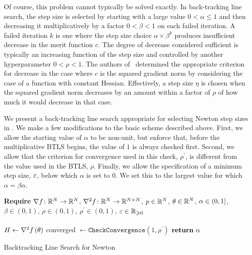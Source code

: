 \documentclass[../../thesis.tex]{subfiles}
\begin{document}
Of course, this problem cannot typically be solved exactly.
In back-tracking line search,
the step size is selected by starting with a large value
$0 < \alpha \leq 1$
and then decreasing it multiplicatively by a factor $0 < \beta < 1$
on each failed iteration.
A failed iteration $k$ is one where the step size choice
$\alpha \times \beta^k$
produces insufficient decrease in the merit function $c$.
The degree of decrease considered sufficient
is typically an increasing function of the step size
and controlled by another hyperparameter $0 < \rho < 1$.
The authors of~\cite{roosta2018}
determined the appropriate criterion for decrease
in the case where $c$ is the squared gradient norm
by considering the case of a function with constant Hessian.
Effectively, a step size $\eta$ is chosen
when the squared gradient norm decreases by an amount within
a factor of $\rho$ of how much it would decrease
in that case.

We present a back-tracking line search
appropriate for selecting Newton step sizes
in .
We make a few modifications to the basic scheme described above.
First, we allow the starting value of $\alpha$ to be non-unit,
but enforce that, before the multiplicative BTLS begins,
the value of $1$ is always checked first.
Second, we allow that
the criterion for convergence used in this check,
$\rho^\prime$,
is different from the value
used in the BTLS, $\rho$.
Finally,
we allow the specification of a minimum step size, $\varepsilon$,
below which $\alpha$ is set to $0$.
We set this to the largest value for which
$\alpha = \beta\alpha$.
\\
\begin{algorithm}[h]
    \SetAlgoLined{}
    \textbf{Require}
    $\nabla f\colon\mathbb{R}^N\to\mathbb{R}^N$,
    $\nabla^2 f\colon\mathbb{R}^N\to\mathbb{R}^{N\times N}$,
    $p \in \mathbb{R}^N$,
    $\theta \in \mathbb{R}^N$,
    $\alpha \in \intervaloc{0}{1}$,
    $\beta \in (0, 1)$,
    $\rho \in (0, 1)$,
    $\rho^\prime \in (0, 1)$,
    $\varepsilon \in \mathbb{R}_{\geqslant 0}$\\ \ \\
    \DontPrintSemicolon
    $H \leftarrow \nabla^2f\left(\theta\right)$\;
    \;
    converged $\leftarrow \texttt{CheckConvergence}\left(
    	1, \rho^\prime\right)$\;
    $\KwRet\ \alpha$%
    \caption{Backtracking Line Search for Newton}
\end{algorithm}
\end{document}
